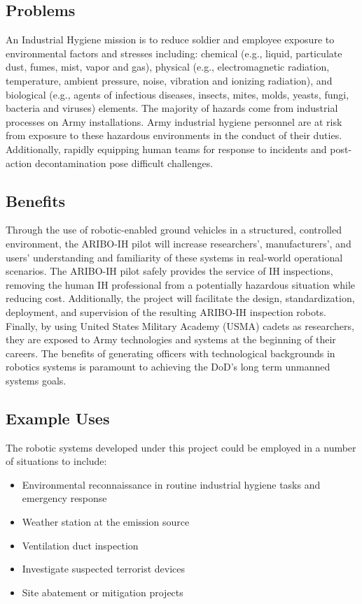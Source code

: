 \subsection{Problems}

An Industrial Hygiene mission is to reduce soldier and employee exposure to environmental factors and stresses including:  chemical (e.g., liquid, particulate dust, fumes, mist, vapor and gas), physical (e.g., electromagnetic radiation, temperature, ambient pressure, noise, vibration and ionizing radiation), and biological (e.g., agents of infectious diseases, insects, mites, molds, yeasts, fungi, bacteria and viruses) elements. The majority of hazards come from industrial processes on Army installations. Army industrial hygiene personnel are at risk from exposure to these hazardous environments in the conduct of their duties. Additionally, rapidly equipping human teams for response to incidents and post-action decontamination pose difficult challenges.  

\subsection{Benefits}

Through the use of robotic-enabled ground vehicles in a structured, controlled environment, the ARIBO-IH pilot will increase researchers’, manufacturers’, and users’ understanding and familiarity of these systems in real-world operational scenarios. The ARIBO-IH pilot safely provides the service of IH inspections, removing the human IH professional from a potentially hazardous situation while reducing cost. Additionally, the project will facilitate the design, standardization, deployment, and supervision of the resulting ARIBO-IH inspection robots. Finally, by using United States Military Academy (USMA) cadets as researchers, they are exposed to Army technologies and systems at the beginning of their careers.  The benefits of generating officers with technological backgrounds in robotics systems is paramount to achieving the DoD’s long term unmanned systems goals.

\subsection{Example Uses}
The robotic systems developed under this project could be employed in a number of situations to include:
\begin{itemize}
	\item Environmental reconnaissance in routine industrial hygiene tasks and emergency response
	\item Weather station at the emission source
	\item Ventilation duct inspection
	\item Investigate suspected terrorist devices
	\item Site abatement or mitigation projects
\end{itemize}

